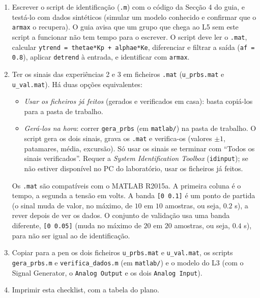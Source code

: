 \documentclass[a4paper,11pt]{article}
\begin{document}
\begin{enumerate}[label=$\square$, leftmargin=1.5em]
  \item Escrever o script de identificação (\texttt{.m}) com o código da Secção 4 do guia, e testá-lo com dados sintéticos (simular um modelo conhecido e confirmar que o \texttt{armax} o recupera).
  O guia avisa que um grupo que chega ao L5 sem este script a funcionar não tem tempo para o escrever.
  O script deve ler o \texttt{.mat}, calcular \texttt{ytrend = thetae*Kp + alphae*Ke}, diferenciar e filtrar a saída (\texttt{af = 0.8}), aplicar \texttt{detrend} à entrada, e identificar com \texttt{armax}.

  \item Ter os sinais das experiências 2 e 3 em ficheiros \texttt{.mat} (\texttt{u\_prbs.mat} e \texttt{u\_val.mat}).
  Há duas opções equivalentes:
  \begin{itemize}
    \item \emph{Usar os ficheiros já feitos} (gerados e verificados em casa): basta copiá-los para a pasta de trabalho.
    \item \emph{Gerá-los na hora}: correr \texttt{gera\_prbs} (em \texttt{matlab/}) na pasta de trabalho.
    O script gera os dois sinais, grava os \texttt{.mat} e verifica-os (valores $\pm 1$, patamares, média, excursão).
    Só usar os sinais se terminar com ``Todos os sinais verificados''.
    Requer a \emph{System Identification Toolbox} (\texttt{idinput}); se não estiver disponível no PC do laboratório, usar os ficheiros já feitos.
  \end{itemize}
  Os \texttt{.mat} são compatíveis com o MATLAB R2015a.
  A primeira coluna é o tempo, a segunda a tensão em volts.
  A banda \texttt{[0 0.1]} é um ponto de partida (o sinal muda de valor, no máximo, de $10$ em $10$ amostras, ou seja, $0.2$ s), a rever depois de ver os dados.
  O conjunto de validação usa uma banda diferente, \texttt{[0 0.05]} (muda no máximo de $20$ em $20$ amostras, ou seja, $0.4$ s), para não ser igual ao de identificação.

  \item Copiar para a pen os dois ficheiros \texttt{u\_prbs.mat} e \texttt{u\_val.mat}, os scripts \texttt{gera\_prbs.m} e \texttt{verifica\_dados.m} (em \texttt{matlab/}) e o modelo do L3 (com o Signal Generator, o \texttt{Analog Output} e os dois \texttt{Analog Input}).

  \item Imprimir esta checklist, com a tabela do plano.
\end{enumerate}
\end{document}

